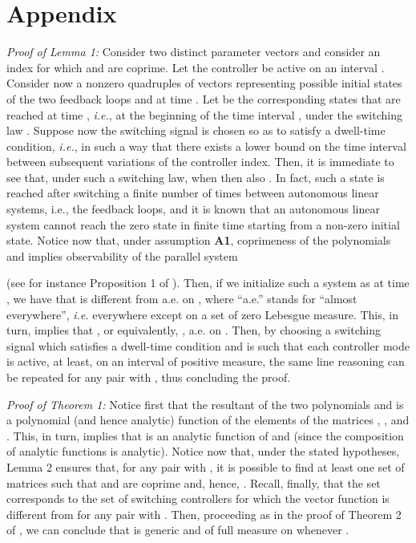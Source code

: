 \documentclass[letterpaper, 10 pt, conference]{ieeetran}
\def\qedp{\hspace*{\fill}~{\tiny }}
\begin{document}
\section*{Appendix}


{\em Proof of Lemma 1:} Consider two distinct parameter vectors  and consider an index  for which  and 
are coprime. Let the controller  be active on an interval .
Consider now a nonzero quadruples of vectors  representing possible initial states of the two feedback loops  
and  at time . Let  be the corresponding states 
that are reached at time , \emph{i.e.}, at the beginning of the time
interval , under the switching law . Suppose now the switching signal  is chosen so as to satisfy a dwell-time condition, \emph{i.e.}, in such a way that there exists a lower bound
 on the time interval between subsequent variations of the controller index. Then, it is immediate to see that, under such a switching law, 
when  then also . In fact, such a state is reached after switching a finite number of times between 
autonomous linear systems, i.e., the feedback loops, and
it is known that an autonomous linear system cannot reach the zero state in finite time starting from a non-zero initial state. Notice now that, under assumption \textbf{A1}, coprimeness of
the polynomials  and  implies observability of the parallel system

(see for instance Proposition 1 of \cite{Ba13}).
Then, if we initialize such a system as  at time ,
we have that  is different from  a.e. on ,
where ``a.e.'' stands for ``almost everywhere'', \emph{i.e.} everywhere 
except on a set of zero Lebesgue measure. This, in turn, implies that
, or equivalently, 
,  a.e. on . Then, by choosing a switching signal  which satisfies
a dwell-time condition and is such that each controller mode  is active, at least, on an interval  of positive measure, the same line reasoning can be repeated
for any pair  with , thus concluding the proof. \qedp

{\em Proof of Theorem 1:} 
Notice first that the resultant  of the two polynomials  and  is a polynomial (and hence analytic) function of the elements
of the matrices , , and . This, in turn, implies that  is an analytic function of  and
 (since the composition of analytic functions is analytic). Notice now that, under the stated hypotheses, Lemma 2 ensures that, for any pair  with ,
it is possible to find at least one set of matrices  such that  and  are coprime and, hence,
. Recall, finally, that the set  corresponds to the set of switching controllers  for which the vector function
  is different from  for any pair  with .
Then, proceeding as in the proof of Theorem 2 of \cite{Sontag}, we can conclude that  is generic and of full measure on  whenever .
\qedp
\end{document}
